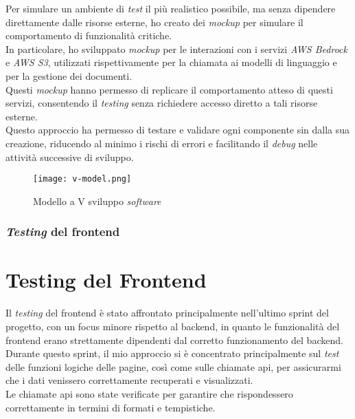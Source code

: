 \noindent Per simulare un ambiente di \textit{test} il più realistico possibile, ma senza dipendere direttamente dalle risorse esterne, ho creato dei \textit{mockup} per simulare il comportamento di funzionalità critiche.\\
In particolare, ho sviluppato \textit{mockup} per le interazioni con i servizi \textit{AWS Bedrock} e \textit{AWS S3}, utilizzati rispettivamente per la chiamata ai modelli di linguaggio e per la gestione dei documenti.\\
Questi \textit{mockup} hanno permesso di replicare il comportamento atteso di questi servizi, consentendo il \textit{testing} senza richiedere accesso diretto a tali risorse esterne.\\

\noindent Questo approccio ha permesso di testare e validare ogni componente sin dalla sua creazione, riducendo al minimo i rischi di errori e facilitando il \textit{debug} nelle attività successive di sviluppo.

\begin{figure}[H]
    \centering
    \texttt{[image: v-model.png]}
    \caption{Modello a V sviluppo \textit{software}}
    \label{fig:v-model}  
    \cite{site:v-model}
\end{figure}

\subsubsection{\textit{Testing} del \gls{frontend}}


\section{Testing del Frontend}

Il \textit{testing} del \gls{frontend} è stato affrontato principalmente nell'ultimo \gls{sprint} del progetto, con un focus minore rispetto al \gls{backend}, in quanto le funzionalità del \gls{frontend} erano strettamente dipendenti dal corretto funzionamento del \gls{backend}.\\

\noindent Durante questo \gls{sprint}, il mio approccio si è concentrato principalmente sul \textit{test} delle funzioni logiche delle pagine, così come sulle chiamate \gls{api}, per assicurarmi che i dati venissero correttamente recuperati e visualizzati.\\
Le chiamate \gls{api} sono state verificate per garantire che rispondessero correttamente in termini di formati e tempistiche.\\

